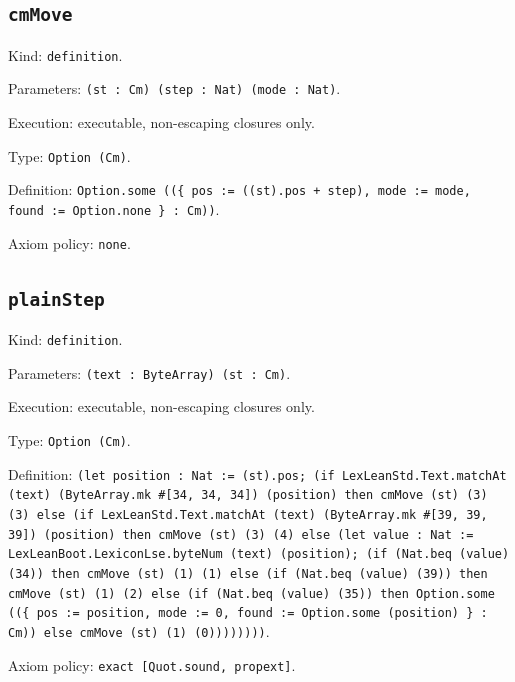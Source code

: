 \documentclass[11pt]{article}
\begin{document}
\subsection*{\texttt{cmMove}}
\noindent Kind: \texttt{definition}.\par
\noindent Parameters: \texttt{(st : Cm) (step : Nat) (mode : Nat)}.\par
\noindent Execution: executable, non-escaping closures only.\par
\noindent Type: \texttt{Option (Cm)}.\par
\noindent Definition: \texttt{Option.some ((\{ pos := ((st).pos + step), mode := mode, found := Option.none \} : Cm))}.\par
\noindent Axiom policy: \texttt{none}.\par
\subsection*{\texttt{plainStep}}
\noindent Kind: \texttt{definition}.\par
\noindent Parameters: \texttt{(text : ByteArray) (st : Cm)}.\par
\noindent Execution: executable, non-escaping closures only.\par
\noindent Type: \texttt{Option (Cm)}.\par
\noindent Definition: \texttt{(let position : Nat := (st).pos; (if LexLeanStd.Text.matchAt (text) (ByteArray.mk \#[34, 34, 34]) (position) then cmMove (st) (3) (3) else (if LexLeanStd.Text.matchAt (text) (ByteArray.mk \#[39, 39, 39]) (position) then cmMove (st) (3) (4) else (let value : Nat := LexLeanBoot.LexiconLse.byteNum (text) (position); (if (Nat.beq (value) (34)) then cmMove (st) (1) (1) else (if (Nat.beq (value) (39)) then cmMove (st) (1) (2) else (if (Nat.beq (value) (35)) then Option.some ((\{ pos := position, mode := 0, found := Option.some (position) \} : Cm)) else cmMove (st) (1) (0))))))))}.\par
\noindent Axiom policy: \texttt{exact [Quot.sound, propext]}.\par
\end{document}

